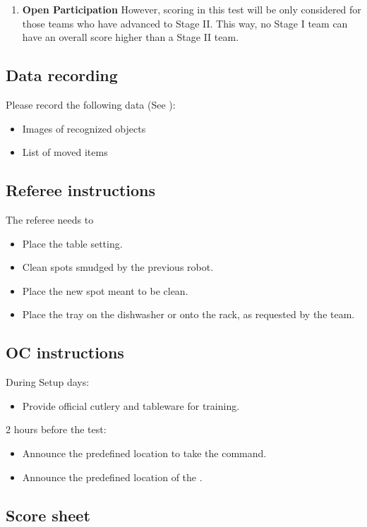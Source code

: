 \begin{enumerate}
	\item \textbf{Open Participation}
	\openpart
	However, scoring in this test will be only considered for those teams who have advanced to Stage II. This way, no Stage I team can have an overall score higher than a Stage II team.

\end{enumerate}

\subsection{Data recording}
Please record the following data (See ):
\begin{itemize}
	\item Images of recognized objects
	\item List of moved items
\end{itemize}

\subsection{Referee instructions}

The referee needs to
\begin{itemize}
	\item Place the table setting.
	\item Clean spots smudged by the previous robot.
	\item Place the new spot meant to be clean.
	\item Place the tray on the dishwasher or onto the rack, as requested by the team.
\end{itemize}

\subsection{OC instructions}
During Setup days:
\begin{itemize}
	\item Provide official cutlery and tableware for training.
\end{itemize}

2 hours before the test:
\begin{itemize}
	\item Announce the predefined location to take the command.
	\item Announce the predefined location of the \TidePod.
\end{itemize}

\newpage
\subsection{Score sheet}



